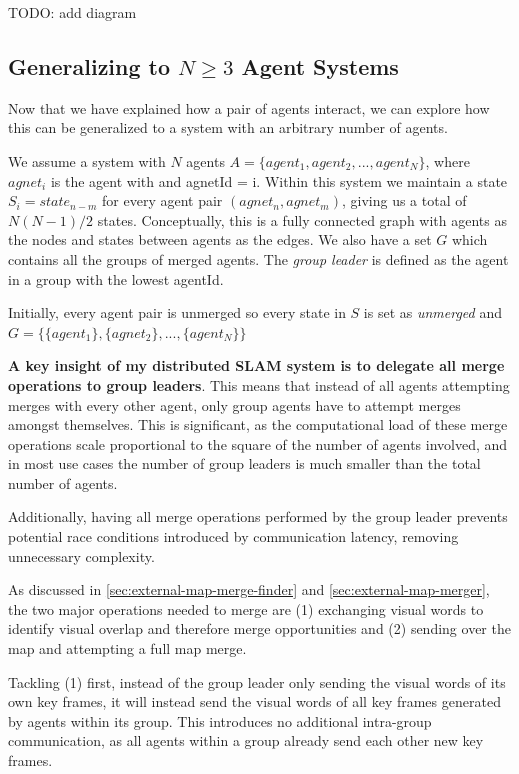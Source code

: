 TODO: add diagram

\subsection{Generalizing to $N \geq 3$ Agent Systems}
\label{sec:generalizing-to-n-geq-3-agent-systems}
Now that we have explained how a pair of agents interact, we can explore how this can be generalized to a system with an arbitrary number of agents.

We assume a system with $N$ agents $A=\{agent_1, agent_2, ..., agent_N\}$, where $agnet_i$ is the agent with and agnetId = i. Within this system we maintain a state $S_i=state_{n-m}$ for every agent pair $(agnet_n, agnet_m)$, giving us a total of $N(N-1)/2$ states. Conceptually, this is a fully connected graph with agents as the nodes and states between agents as the edges. We also have a set $G$ which contains all the groups of merged agents. The \textit{group leader} is defined as the agent in a group with the lowest agentId.

Initially, every agent pair is unmerged so every state in $S$ is set as \textit{unmerged} and $G=\{\{agent_1\}, \{agnet_2\}, ..., \{agent_N\}\}$

\textbf{A key insight of my distributed SLAM system is to delegate all merge operations to group leaders}. This means that instead of all agents attempting merges with every other agent, only group agents have to attempt merges amongst themselves. This is significant, as the computational load of these merge operations scale proportional to the square of the number of agents involved, and in most use cases the number of group leaders is much smaller than the total number of agents.

Additionally, having all merge operations performed by the group leader prevents potential race conditions introduced by communication latency, removing unnecessary complexity.

As discussed in \autoref{sec:external-map-merge-finder} and \autoref{sec:external-map-merger}, the two major operations needed to merge are (1) exchanging visual words to identify visual overlap and therefore merge opportunities and (2) sending over the map and attempting a full map merge.

Tackling (1) first, instead of the group leader only sending the visual words of its own key frames, it will instead send the visual words of all key frames generated by agents within its group. This introduces no additional intra-group communication, as all agents within a group already send each other new key frames.

